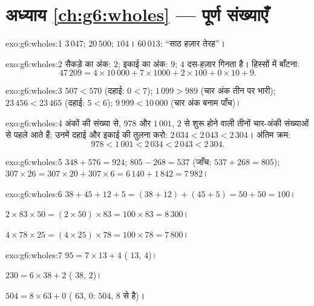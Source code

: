 \section*{अध्याय \ref{ch:g6:wholes} --- पूर्ण संख्याएँ}

\begin{solution}{exo:g6:wholes:1}
$3\,047$; \quad $20\,500$; \quad $104$। \quad
$60\,013$: ``साठ हज़ार तेरह''।
\end{solution}

\begin{solution}{exo:g6:wholes:2}
सैकड़े का अंक: $2$; इकाई का अंक: $9$; $4$ दस-हज़ार गिनता है।
हिस्सों में बाँटना:
\[
47\,209 = 4 \times 10\,000 + 7 \times 1000 + 2 \times 100 + 0 \times 10
+ 9 .
\]
\end{solution}

\begin{solution}{exo:g6:wholes:3}
$507 < 570$ (दहाई: $0 < 7$); \quad
$1\,099 > 989$ (चार अंक तीन पर भारी); \quad
$23\,456 < 23\,465$ (दहाई: $5 < 6$); \quad
$9\,999 < 10\,000$ (चार अंक बनाम पाँच)।
\end{solution}

\begin{solution}{exo:g6:wholes:4}
अंकों की संख्या से, $978$ और $1\,001$, $2$ से शुरू होने वाली
तीनों चार-अंकी संख्याओं से पहले आते हैं; उनमें दहाई और इकाई की
तुलना करो: $2\,034 < 2\,043 < 2\,304$। अंतिम क्रम:
\[
978 < 1\,001 < 2\,034 < 2\,043 < 2\,304 .
\]
\end{solution}

\begin{solution}{exo:g6:wholes:5}
$348 + 576 = 924$; \quad $805 - 268 = 537$ (जाँच:
$537 + 268 = 805$); \quad $307 \times 26 = 307 \times 20 + 307 \times 6
= 6\,140 + 1\,842 = 7\,982$।
\end{solution}

\begin{solution}{exo:g6:wholes:6}
$38 + 45 + 12 + 5 = (38 + 12) + (45 + 5) = 50 + 50 = 100$।

$2 \times 83 \times 50 = (2 \times 50) \times 83 = 100 \times 83 =
8\,300$।

$4 \times 78 \times 25 = (4 \times 25) \times 78 = 100 \times 78 =
7\,800$।
\end{solution}

\begin{solution}{exo:g6:wholes:7}
$95 = 7 \times 13 + 4$ ( $13$,  $4$)।

$230 = 6 \times 38 + 2$ ( $38$,  $2$)।

$504 = 8 \times 63 + 0$ ( $63$,  $0$: $504$, $8$ से
 है)।
\end{solution}


